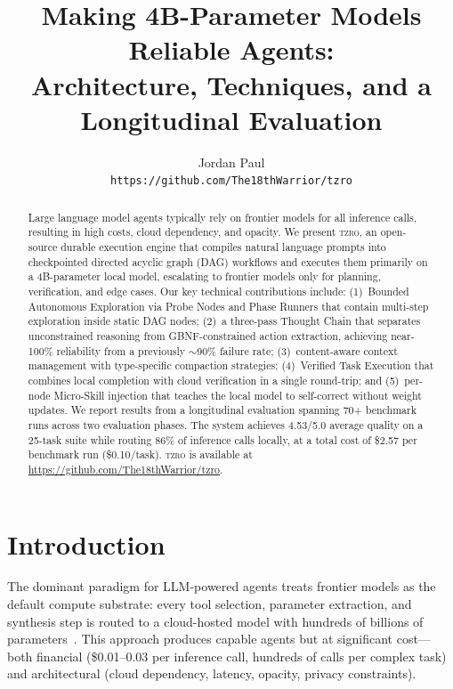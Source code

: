 \documentclass{article}
\title{Making 4B-Parameter Models Reliable Agents:\\Architecture, Techniques, and a Longitudinal Evaluation}
\author{
  Jordan Paul \\
  \texttt{https://github.com/The18thWarrior/tzro}
}
\begin{document}
\maketitle

\begin{abstract}
Large language model agents typically rely on frontier models for all inference calls, resulting in high costs, cloud dependency, and opacity.
We present \textsc{tzro}, an open-source durable execution engine that compiles natural language prompts into checkpointed directed acyclic graph (DAG) workflows and executes them primarily on a 4B-parameter local model, escalating to frontier models only for planning, verification, and edge cases.
Our key technical contributions include: (1)~Bounded Autonomous Exploration via Probe Nodes and Phase Runners that contain multi-step exploration inside static DAG nodes; (2)~a three-pass Thought Chain that separates unconstrained reasoning from GBNF-constrained action extraction, achieving near-100\% reliability from a previously $\sim$90\% failure rate; (3)~content-aware context management with type-specific compaction strategies; (4)~Verified Task Execution that combines local completion with cloud verification in a single round-trip; and (5)~per-node Micro-Skill injection that teaches the local model to self-correct without weight updates.
We report results from a longitudinal evaluation spanning 70+ benchmark runs across two evaluation phases.
The system achieves 4.53/5.0 average quality on a 25-task suite while routing 86\% of inference calls locally, at a total cost of \$2.57 per benchmark run (\$0.10/task).
\textsc{tzro} is available at \url{https://github.com/The18thWarrior/tzro}.
\end{abstract}

\section{Introduction}
\label{sec:introduction}

The dominant paradigm for LLM-powered agents treats frontier models as the default compute substrate: every tool selection, parameter extraction, and synthesis step is routed to a cloud-hosted model with hundreds of billions of parameters~\cite{autogen2023,crewai2024,langchain2023}.
This approach produces capable agents but at significant cost---both financial (\$0.01--0.03 per inference call, hundreds of calls per complex task) and architectural (cloud dependency, latency, opacity, privacy constraints).
\end{document}
